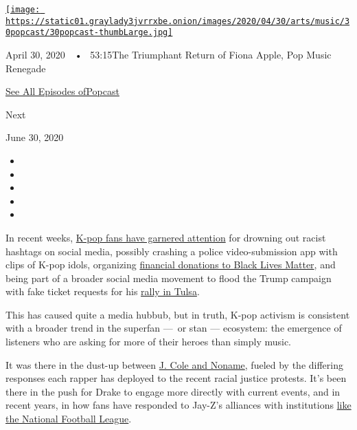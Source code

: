 \href{https://www.nytimes3xbfgragh.onion/2020/04/30/arts/music/popcast-fiona-apple.html?action=click\&module=audio-series-bar\&region=header\&pgtype=Article}{\texttt{[image: https://static01.graylady3jvrrxbe.onion/images/2020/04/30/arts/music/30popcast/30popcast-thumbLarge.jpg]}}

April 30, 2020~~•~ 53:15The Triumphant Return of Fiona Apple, Pop Music
Renegade

\href{https://www.nytimes3xbfgragh.onion/column/popcast-pop-music-podcast}{See
All Episodes ofPopcast}

Next

June 30, 2020

\begin{itemize}
\item
\item
\item
\item
\item
\end{itemize}

In recent weeks,
\href{https://www.nytimes3xbfgragh.onion/2020/06/22/arts/music/k-pop-fans-trump-politics.html}{K-pop
fans have garnered attention} for drowning out racist hashtags on social
media, possibly crashing a police video-submission app with clips of
K-pop idols, organizing
\href{https://www.nytimes3xbfgragh.onion/2020/06/08/arts/music/bts-donate-black-lives-matter.html}{financial
donations to Black Lives Matter}, and being part of a broader social
media movement to flood the Trump campaign with fake ticket requests for
his
\href{https://www.nytimes3xbfgragh.onion/2020/06/21/style/tiktok-trump-rally-tulsa.html}{rally
in Tulsa}.

This has caused quite a media hubbub, but in truth, K-pop activism is
consistent with a broader trend in the superfan ---~or stan ---
ecosystem: the emergence of listeners who are asking for more of their
heroes than simply music.

It was there in the dust-up between
\href{https://www.nytimes3xbfgragh.onion/2020/06/19/arts/music/playlist-noname-aretha-franklin-saweetie.html}{J.
Cole and Noname}, fueled by the differing responses each rapper has
deployed to the recent racial justice protests. It's been there in the
push for Drake to engage more directly with current events, and in
recent years, in how fans have responded to Jay-Z's alliances with
institutions
\href{https://www.nytimes3xbfgragh.onion/2020/02/01/style/jay-z-super-bowl-roc-nation.html}{like
the National Football League}.

